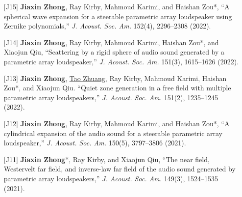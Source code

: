 \documentclass[10pt,a4paper,ragged2e,withhyper]{altacv}
\newcommand{\PubJournal}[1]{\textit{#1}}
\newcommand{\PubTitle}[1]{``{#1,}''}
\newcommand{\PubCorAuthor}[1]{#1*}
\newcommand{\PubMe}[1]{\textbf{#1}}
\begin{document}
\begin{paracol}{1}
\begin{itemize}[leftmargin = 30pt]
    \item[{[J15]}]
        \PubMe{Jiaxin Zhong}, Ray Kirby, Mahmoud Karimi, and \PubCorAuthor{Haishan Zou},
        \PubTitle{A spherical wave expansion for a steerable parametric array loudspeaker using Zernike polynomials} 
        \PubJournal{J. Acoust. Soc. Am.} 
        152(4), 2296--2308 (2022).
        \href{https://doi.org/10.1121/10.0014832}{\color{accent}\aiDoi}
        \href{https://github.com/JiaxinZhong/JiaxinZhong.github.io/raw/master/publications/journal/Zhong2022-JASA-PAL_Zernike.pdf}{\color{accent}\faFilePdf[regular]}

    \item[{[J14]}]
        \PubMe{Jiaxin Zhong}, Ray Kirby, Mahmoud Karimi, \PubCorAuthor{Haishan Zou}, and Xiaojun Qiu,
        \PubTitle{Scattering by a rigid sphere of audio sound generated by a parametric array loudspeaker} 
        \PubJournal{J. Acoust. Soc. Am.} 
        151(3), 1615--1626 (2022).
        \href{https://doi.org/10.1121/10.0009750}{\color{accent}\aiDoi}
        \href{https://github.com/JiaxinZhong/JiaxinZhong.github.io/raw/master/publications/journal/Zhong2022-JASA-PAL_sphere.pdf}{\color{accent}\faFilePdf[regular]}

    \item[{[J13]}]
        \PubMe{Jiaxin Zhong}, \underline{Tao Zhuang}, Ray Kirby, Mahmoud Karimi, \PubCorAuthor{Haishan Zou}, and Xiaojun
Qiu. 
        \PubTitle{Quiet zone generation in a free field with multiple parametric array loudspeakers} 
        \PubJournal{J. Acoust. Soc. Am.} 151(2), 1235--1245 (2022).
        \href{https://doi.org/10.1121/10.0009587}{\color{accent}\aiDoi}
        \href{https://github.com/JiaxinZhong/JiaxinZhong.github.io/raw/master/publications/journal/Zhong2022-JASA-PAL_ANC.pdf}{\color{accent}\faFilePdf[regular]}

    \item[{[J12]}]
        \PubMe{Jiaxin Zhong}, Ray Kirby, Mahmoud Karimi, and \PubCorAuthor{Haishan Zou}, 
        \PubTitle{A cylindrical expansion of the audio sound for a steerable parametric array loudspeaker}
        \PubJournal{J. Acoust. Soc. Am.}
        150(5), 3797--3806 (2021).
        \href{https://doi.org/10.1121/10.0007280}{\color{accent}\aiDoi}
        \href{https://github.com/JiaxinZhong/JiaxinZhong.github.io/raw/master/publications/journal/Zhong2021-JASA-PAL_cylindrical_expansion.pdf}{\color{accent}\faFilePdf[regular]}

    \item[{[J11]}]
        \PubCorAuthor{\PubMe{Jiaxin Zhong}}, Ray Kirby, and Xiaojun Qiu,         
        \PubTitle{The near field, Westervelt far field, and inverse-law far field of the audio sound generated by parametric array loudspeakers}
        \PubJournal{J. Acoust. Soc. Am.}
        149(3), 1524--1535 (2021).
        \href{https://doi.org/10.1121/10.0003606}{\color{accent}\aiDoi}
        \href{https://github.com/JiaxinZhong/JiaxinZhong.github.io/raw/master/publications/journal/Zhong2021-JASA-PAL_sound_field.pdf}{\color{accent}\faFilePdf[regular]}


\end{itemize}
\end{paracol}
\end{document}
